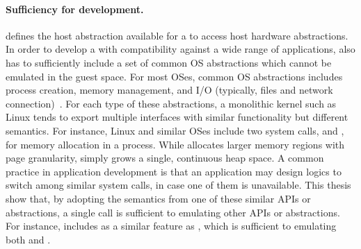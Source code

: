 \paragraph{Sufficiency for \libos{} development.}
\Thehostabi{} defines
the host abstraction available for a \libos{} to access host hardware abstractions.
In order to
develop a \libos{} with compatibility against a wide range of applications,
\thehostabi{}
also has to sufficiently include a set of common OS abstractions
which cannot be emulated in the guest space.
For most OSes,
common OS abstractions
includes
process creation, memory management, and I/O (typically, files and network connection)~\cite{dhamdhere2007os-textbook}.
For each type of these abstractions,
a monolithic kernel such as Linux tends to
export multiple interfaces with similar functionality but different semantics.
For instance, Linux and similar OSes include two system calls,  and , for memory allocation in a process.
While  allocates larger memory regions with page granularity,
 simply grows a single, continuous heap space.
A common practice
in application development
is that an application
may design logics to switch among similar system calls, in case one of them is unavailable.
This thesis show that,
by adopting the semantics from one of these similar APIs or abstractions,
a single call is sufficient
to emulating other APIs or abstractions.
For instance, \thehostabi{} includes 
as a similar feature as ,
which is sufficient to emulating both  and .



